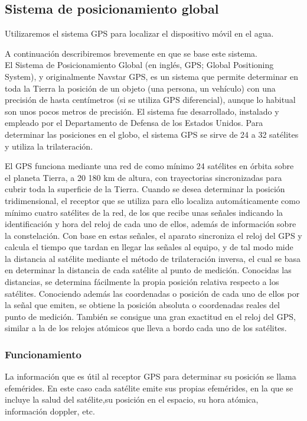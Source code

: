 \subsection{Sistema de posicionamiento global}
Utilizaremos el sistema GPS para localizar el dispositivo móvil en el agua.

A continuación describiremos brevemente en que se base este sistema.
\\

El Sistema de Posicionamiento Global (en inglés, GPS; Global Positioning System), y originalmente Navstar GPS, es un sistema que permite determinar en toda la Tierra la posición de un objeto (una persona, un vehículo) con una precisión de hasta centímetros (si se utiliza GPS diferencial), aunque lo habitual son unos pocos metros de precisión. El sistema fue desarrollado, instalado y empleado por el Departamento de Defensa de los Estados Unidos. Para determinar las posiciones en el globo, el sistema GPS se sirve de 24 a 32 satélites y utiliza la trilateración.

El GPS funciona mediante una red de como mínimo 24 satélites en órbita sobre el planeta Tierra, a 20 180 km de altura, con trayectorias sincronizadas para cubrir toda la superficie de la Tierra. Cuando se desea determinar la posición tridimensional, el receptor que se utiliza para ello localiza automáticamente como mínimo cuatro satélites de la red, de los que recibe unas señales indicando la identificación y hora del reloj de cada uno de ellos, además de información sobre la constelación. Con base en estas señales, el aparato sincroniza el reloj del GPS y calcula el tiempo que tardan en llegar las señales al equipo, y de tal modo mide la distancia al satélite mediante el método de trilateración inversa, el cual se basa en determinar la distancia de cada satélite al punto de medición. Conocidas las distancias, se determina fácilmente la propia posición relativa respecto a los satélites. Conociendo además las coordenadas o posición de cada uno de ellos por la señal que emiten, se obtiene la posición absoluta o coordenadas reales del punto de medición. También se consigue una gran exactitud en el reloj del GPS, similar a la de los relojes atómicos que lleva a bordo cada uno de los satélites.

\subsubsection{Funcionamiento}

La información que es útil al receptor GPS para determinar su posición se llama efemérides. En este caso cada satélite emite sus propias efemérides, en la que se incluye la salud del satélite,su posición en el espacio, su hora atómica, información doppler, etc.

